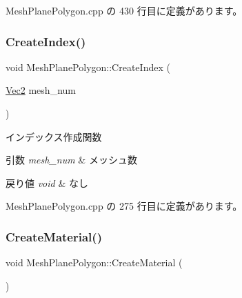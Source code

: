  Mesh\+Plane\+Polygon.\+cpp の 430 行目に定義があります。

\mbox{\label{class_mesh_plane_polygon_ae7067eb849977a12554633e604806f85}} 
\subsubsection{\texorpdfstring{Create\+Index()}{CreateIndex()}}
{\footnotesize\ttfamily void Mesh\+Plane\+Polygon\+::\+Create\+Index (\begin{DoxyParamCaption}\item[{\mbox{\hyperlink{_vector3_d_8h_a5ef6e95dfc5f9d3820b71772d99bbc25}{Vec2}}}]{mesh\+\_\+num }\end{DoxyParamCaption})\hspace{0.3cm}{\ttfamily [private]}}



インデックス作成関数 


\begin{DoxyParams}{引数}
{\em mesh\+\_\+num} & メッシュ数 \\
\hline
\end{DoxyParams}

\begin{DoxyRetVals}{戻り値}
{\em void} & なし \\
\hline
\end{DoxyRetVals}


 Mesh\+Plane\+Polygon.\+cpp の 275 行目に定義があります。

\mbox{\label{class_mesh_plane_polygon_aea5b128def1dae8f391b80be25172b36}} 
\subsubsection{\texorpdfstring{Create\+Material()}{CreateMaterial()}}
{\footnotesize\ttfamily void Mesh\+Plane\+Polygon\+::\+Create\+Material (\begin{DoxyParamCaption}{ }\end{DoxyParamCaption})\hspace{0.3cm}{\ttfamily [private]}}




